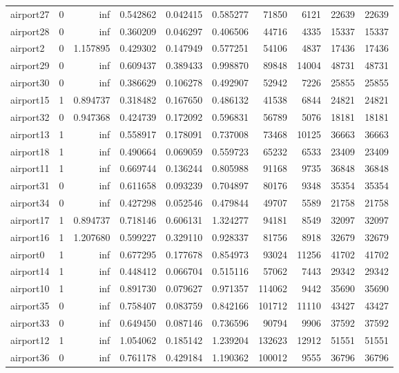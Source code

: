 \documentclass[../../../thesis.tex]{subfiles}
\begin{document}
\begin{longtable}{|l|r|r|r|r|r|r|r|r|r|}
airport27 & 0 & inf & 0.542862 & 0.042415 & 0.585277 & 71850 & 6121 & 22639 & 22639 \\
airport28 & 0 & inf & 0.360209 & 0.046297 & 0.406506 & 44716 & 4335 & 15337 & 15337 \\
airport2 & 0 & 1.157895 & 0.429302 & 0.147949 & 0.577251 & 54106 & 4837 & 17436 & 17436 \\
airport29 & 0 & inf & 0.609437 & 0.389433 & 0.998870 & 89848 & 14004 & 48731 & 48731 \\
airport30 & 0 & inf & 0.386629 & 0.106278 & 0.492907 & 52942 & 7226 & 25855 & 25855 \\
airport15 & 1 & 0.894737 & 0.318482 & 0.167650 & 0.486132 & 41538 & 6844 & 24821 & 24821 \\
airport32 & 0 & 0.947368 & 0.424739 & 0.172092 & 0.596831 & 56789 & 5076 & 18181 & 18181 \\
airport13 & 1 & inf & 0.558917 & 0.178091 & 0.737008 & 73468 & 10125 & 36663 & 36663 \\
airport18 & 1 & inf & 0.490664 & 0.069059 & 0.559723 & 65232 & 6533 & 23409 & 23409 \\
airport11 & 1 & inf & 0.669744 & 0.136244 & 0.805988 & 91168 & 9735 & 36848 & 36848 \\
airport31 & 0 & inf & 0.611658 & 0.093239 & 0.704897 & 80176 & 9348 & 35354 & 35354 \\
airport34 & 0 & inf & 0.427298 & 0.052546 & 0.479844 & 49707 & 5589 & 21758 & 21758 \\
airport17 & 1 & 0.894737 & 0.718146 & 0.606131 & 1.324277 & 94181 & 8549 & 32097 & 32097 \\
airport16 & 1 & 1.207680 & 0.599227 & 0.329110 & 0.928337 & 81756 & 8918 & 32679 & 32679 \\
airport0 & 1 & inf & 0.677295 & 0.177678 & 0.854973 & 93024 & 11256 & 41702 & 41702 \\
airport14 & 1 & inf & 0.448412 & 0.066704 & 0.515116 & 57062 & 7443 & 29342 & 29342 \\
airport10 & 1 & inf & 0.891730 & 0.079627 & 0.971357 & 114062 & 9442 & 35690 & 35690 \\
airport35 & 0 & inf & 0.758407 & 0.083759 & 0.842166 & 101712 & 11110 & 43427 & 43427 \\
airport33 & 0 & inf & 0.649450 & 0.087146 & 0.736596 & 90794 & 9906 & 37592 & 37592 \\
airport12 & 1 & inf & 1.054062 & 0.185142 & 1.239204 & 132623 & 12912 & 51551 & 51551 \\
airport36 & 0 & inf & 0.761178 & 0.429184 & 1.190362 & 100012 & 9555 & 36796 & 36796 \\

\end{longtable}
\end{document}
